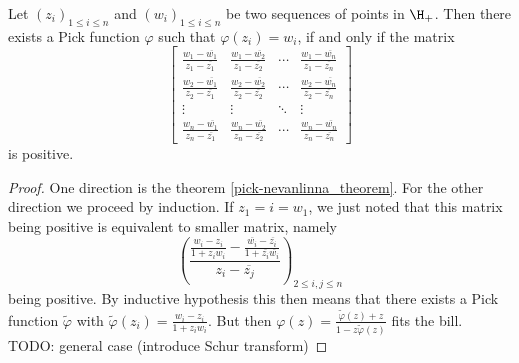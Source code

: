\begin{lause}
	Let $(z_{i})_{1 \leq i \leq n}$ and $(w_{i})_{1 \leq i \leq n}$ be two sequences of points in $\H_{+}$. Then there exists a Pick function $\varphi$ such that $\varphi(z_{i}) = w_{i}$, if and only if the matrix
	\[
		\begin{bmatrix}
		\frac{w_{1} - \overline{w_{1}}}{z_{1} - \overline{z_{1}}} & \frac{w_{1} - \overline{w_{2}}}{z_{1} - \overline{z_{2}}} & \cdots & \frac{w_{1} - \overline{w_{n}}}{z_{1} - \overline{z_{n}}} \\
		\frac{w_{2} - \overline{w_{1}}}{z_{2} - \overline{z_{1}}} & \frac{w_{2} - \overline{w_{2}}}{z_{2} - \overline{z_{2}}} & \cdots & \frac{w_{2} - \overline{w_{n}}}{z_{2} - \overline{z_{n}}} \\
		\vdots & \vdots & \ddots & \vdots \\
		\frac{w_{n} - \overline{w_{1}}}{z_{n} - \overline{z_{1}}} & \frac{w_{n} - \overline{w_{2}}}{z_{n} - \overline{z_{2}}} & \cdots &  \frac{w_{n} - \overline{w_{n}}}{z_{n} - \overline{z_{n}}}
		\end{bmatrix}
	\]
	is positive.
\end{lause}

\begin{proof}
	One direction is the theorem \ref{pick-nevanlinna_theorem}. For the other direction we proceed by induction. If $z_{1} = i = w_{1}$, we just noted that this matrix being positive is equivalent to smaller matrix, namely
	\[
		\left(\frac{\frac{w_{i} - z_{i}}{1 + z_{i} w_{i}} - \frac{\overline{w_{i}} - \overline{z_{i}}}{1 + \overline{z_{i}} \overline{w_{i}}}}{z_{i} - \overline{z_{j}}}\right)_{2 \leq i, j \leq n}
	\]
	being positive. By inductive hypothesis this then means that there exists a Pick function $\tilde{\varphi}$ with $\tilde{\varphi}(z_{i}) = \frac{w_{i} - z_{i}}{1 + z_{i} w_{i}}$. But then $\varphi(z) = \frac{\tilde{\varphi}(z) + z}{1 - z \tilde{\varphi}(z)}$ fits the bill. TODO: general case (introduce Schur transform)
\end{proof}






